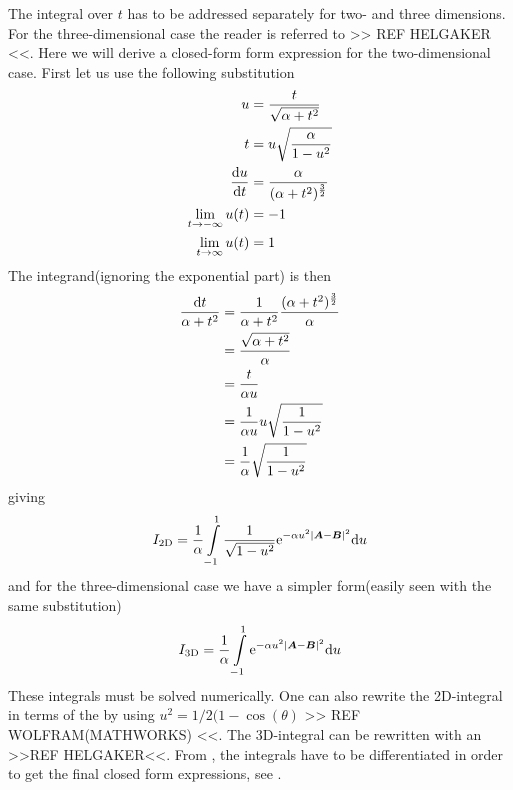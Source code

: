     The integral over $t$ has to be addressed separately for two- and three
    dimensions. For the three-dimensional case the reader is referred to >> REF
    HELGAKER <<. Here we will derive a closed-form form expression for the
    two-dimensional case. First let us use the following substitution
        \begin{equation}
            \begin{aligned}
                u &= \frac{t}{\sqrt{\alpha+t^2}} \\
                t &= u\sqrt{\frac{\alpha}{1-u^2}} \\
                \frac{\mathrm{d} u}{\mathrm{d} t} &= \frac{\alpha}{(\alpha + t^2)^{\frac{3}{2}}} \\
                \lim\limits_{t\rightarrow -\infty} u(t) &= -1 \\
                \lim\limits_{t\rightarrow \infty} u(t) &= 1 \\
            \end{aligned}
            \label{eq:uSubs1}
        \end{equation}
    The integrand(ignoring the exponential part) is then
        \begin{align}
            \frac{\mathrm{d} t}{\alpha + t^2} &= \frac{1}{\alpha + t^2} \frac{(\alpha +
            t^2)^{\frac{3}{2}}}{\alpha} \nonumber \\
            &= \frac{\sqrt{\alpha + t^2}}{\alpha} \nonumber \\
            &= \frac{t}{\alpha u} \nonumber \\
            &= \frac{1}{\alpha u} u\sqrt{\frac{1}{1-u^2}} \nonumber \\
            &= \frac{1}{\alpha}\sqrt{\frac{1}{1-u^2}}
        \end{align}
    giving
        \begin{align}
            I_{\text{2D}} = \frac{1}{\alpha}\int\limits^1_{-1}
            \frac{1}{\sqrt{1-u^2}} \mathrm{e}^{-\alpha u^2\abs{\boldsymbol{{A}} - \boldsymbol{{B}}}^2}
            \mathrm{d} u
            \label{eq:oneElectron2D}
        \end{align}
    and for the three-dimensional case we have a simpler form(easily seen with
    the same substitution)
        \begin{align}
            I_{\text{3D}} = \frac{1}{\alpha}\int\limits^1_{-1} \mathrm{e}^{-\alpha
            u^2\abs{\boldsymbol{{A}} - \boldsymbol{{B}}}^2} \mathrm{d} u
            \label{eq:oneElectron3D}
        \end{align}
    These integrals must be solved numerically. One can also rewrite the
    2D-integral in terms of the 
    by using $u^2=1/2(1 - \cos(\theta)$ >> REF WOLFRAM(MATHWORKS) <<. The
    3D-integral can be rewritten with an 
    >>REF HELGAKER<<. From , the integrals have to be
    differentiated in order to get the final closed form expressions, see
    .

